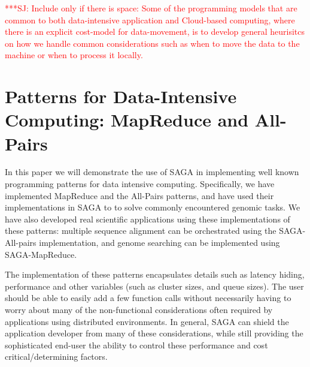 \documentclass[conference,final]{IEEEtran}
\newcommand{\jhanote}[1]{ {\textcolor{red} { ***SJ: #1 }}}
\newcommand{\jhanote}[1]{}
\begin{document}




\jhanote{Include only if there is space: Some of the programming
  models that are common to both data-intensive application and
  Cloud-based computing, where there is an explicit cost-model for
  data-movement, is to develop general heurisitcs on how we handle
  common considerations such as when to move the data to the machine
  or when to process it locally.}

\section{Patterns for Data-Intensive Computing: MapReduce and
  All-Pairs}

In this paper we will demonstrate the use of SAGA in implementing well
known programming patterns for data intensive computing.
Specifically, we have implemented MapReduce and the All-Pairs
patterns, and have used their implementations in SAGA to to solve
commonly encountered genomic tasks.  We have also developed real
scientific applications using these implementations of these patterns:
multiple sequence alignment can be orchestrated using the
SAGA-All-pairs implementation, and genome searching can be implemented
using SAGA-MapReduce.

The implementation of these patterns encapsulates details such as
latency hiding, performance and other variables (such as cluster
sizes, and queue sizes).  The user should be able to easily add a few
function calls without necessarily having to worry about many of the
non-functional considerations often required by applications using
distributed environments.  In general, SAGA can shield the application
developer from many of these considerations, while still providing the
sophisticated end-user the ability to control these performance and
cost critical/determining factors.
\end{document}
